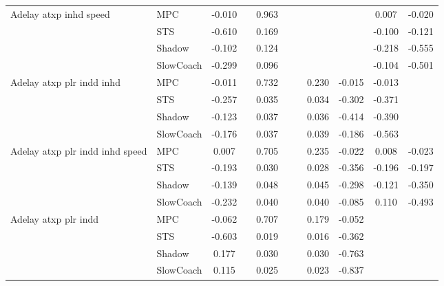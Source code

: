\begin{tabular}{|l|l|*{9}{c|}}
\midrule
Adelay atxp inhd speed    & MPC &   -0.010 &        &     0.963 &     &     &     &      &   0.007 &   -0.020 \\
                              & STS &   -0.610 &        &     0.169 &     &     &     &      &  -0.100 &   -0.121 \\
                              & Shadow &   -0.102 &        &     0.124 &     &     &     &      &  -0.218 &   -0.555 \\
                              & SlowCoach &   -0.299 &        &     0.096 &     &     &     &      &  -0.104 &   -0.501 \\
\midrule
Adelay atxp plr indd inhd    & MPC &   -0.011 &        &     0.732 &     &     &  0.230 &  -0.015 &  -0.013 &       \\
                              & STS &   -0.257 &        &     0.035 &     &     &  0.034 &  -0.302 &  -0.371 &       \\
                              & Shadow &   -0.123 &        &     0.037 &     &     &  0.036 &  -0.414 &  -0.390 &       \\
                              & SlowCoach &   -0.176 &        &     0.037 &     &     &  0.039 &  -0.186 &  -0.563 &       \\
\midrule
Adelay atxp plr indd inhd speed    & MPC &    0.007 &        &     0.705 &     &     &  0.235 &  -0.022 &   0.008 &   -0.023 \\
                              & STS &   -0.193 &        &     0.030 &     &     &  0.028 &  -0.356 &  -0.196 &   -0.197 \\
                              & Shadow &   -0.139 &        &     0.048 &     &     &  0.045 &  -0.298 &  -0.121 &   -0.350 \\
                              & SlowCoach &   -0.232 &        &     0.040 &     &     &  0.040 &  -0.085 &   0.110 &   -0.493 \\
\midrule
Adelay atxp plr indd    & MPC &   -0.062 &        &     0.707 &     &     &  0.179 &  -0.052 &      &       \\
                              & STS &   -0.603 &        &     0.019 &     &     &  0.016 &  -0.362 &      &       \\
                              & Shadow &    0.177 &        &     0.030 &     &     &  0.030 &  -0.763 &      &       \\
                              & SlowCoach &    0.115 &        &     0.025 &     &     &  0.023 &  -0.837 &      &       \\

\end{tabular}
